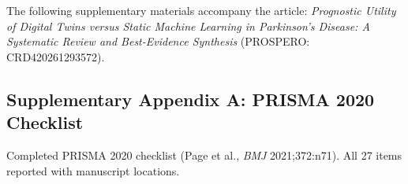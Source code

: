 \documentclass[11pt,a4paper]{article}
\begin{document}
The following supplementary materials accompany the article: \emph{Prognostic Utility of Digital Twins versus Static Machine Learning in Parkinson's Disease: A Systematic Review and Best-Evidence Synthesis} (PROSPERO: CRD420261293572).

\subsection*{Supplementary Appendix A: PRISMA 2020 Checklist}

\noindent Completed PRISMA 2020 checklist (Page et al., \textit{BMJ} 2021;372:n71). All 27 items reported with manuscript locations.
\end{document}
